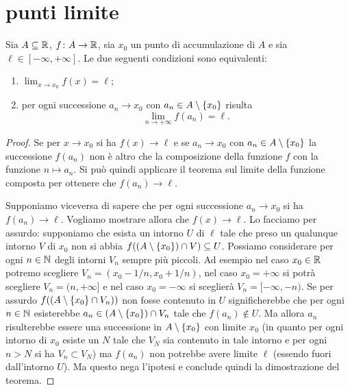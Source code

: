 \section{punti limite}

\begin{theorem}%
\label{th:ponte}%
\mymark{***}%
Sia $A \subseteq {\mathbb R}$, $f\colon A \to {\mathbb R}$, sia $x_0$ un punto di accumulazione di $A$ e sia
$\ell \in [-\infty, +\infty]$.
Le due seguenti condizioni sono equivalenti:
\begin{enumerate}
\item $\displaystyle \lim_{x\to x_0} f(x) = \ell$;
\item per ogni successione $a_n\to x_0$ con $a_n\in A\setminus{\left\{ x_0 \right\}}$ risulta
\[
\lim_{n\to+\infty} f(a_n) = \ell. 
\]
\end{enumerate}
\end{theorem}
%
\begin{proof}
\mymark{***}
Se per $x\to x_0$ si ha $f(x)\to \ell$ e se $a_n \to x_0$ con $a_n\in A\setminus{\left\{ x_0 \right\}}$ la successione $f(a_n)$ non è altro che la composizione
della funzione $f$ con la funzione $n\mapsto a_n$. Si può quindi applicare
il teorema sul limite della funzione composta per ottenere che $f(a_n)\to \ell$.

Supponiamo viceversa di sapere che per ogni successione $a_n\to x_0$ si ha $f(a_n)\to \ell$. Vogliamo mostrare allora che $f(x)\to \ell$. Lo facciamo per assurdo: supponiamo che esista un intorno $U$ di $\ell$ tale che preso un qualunque intorno $V$ di $x_0$ non si abbia $f((A\setminus{\left\{ x_0 \right\}})\cap V)\subseteq U$.
Possiamo considerare per ogni $n\in {\mathbb N}$ degli intorni $V_n$ sempre più piccoli. Ad esempio nel caso $x_0 \in {\mathbb R}$ potremo scegliere $V_n = (x_0-1/n, x_0+1/n)$, nel caso $x_0 = +\infty$ si potrà scegliere $V_n = (n,+\infty]$ e nel caso $x_0=-\infty$ si sceglierà $V_n = [-\infty, -n)$.
Se per assurdo $f((A\setminus{\left\{ x_0 \right\}}\cap V_n))$ non fosse contenuto in $U$
significherebbe che per ogni $n\in{\mathbb N}$ esisterebbe $a_n \in (A\setminus{\left\{ x_0 \right\}})\cap V_n$ tale che $f(a_n)\not \in U$. Ma allora $a_n$ risulterebbe essere una successione in
$A\setminus {\left\{ x_0 \right\}}$ con limite $x_0$
(in quanto per ogni intorno di $x_0$ esiste un $N$ tale che $V_N$ sia contenuto in tale intorno e per ogni $n>N$ si ha $V_n\subset V_N$)
ma $f(a_n)$ non potrebbe avere limite $\ell$
(essendo fuori dall'intorno $U$).
Ma questo nega l'ipotesi e conclude quindi la dimostrazione del teorema.
\end{proof}
